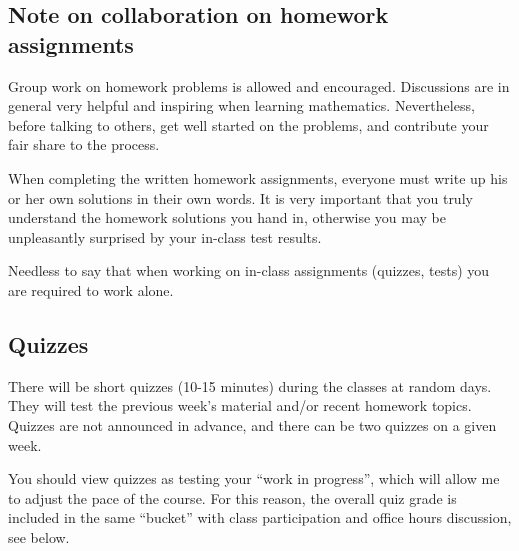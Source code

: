 \documentclass[oneside,11pt]{amsart}
\begin{document}

%

\subsection*{Note on collaboration on homework assignments}
\label{collaboration}

Group work on homework problems is allowed and encouraged.
Discussions are in general very
helpful and inspiring when learning mathematics.
Nevertheless, before talking to others, get well started
on the problems, and contribute your fair share to the process.

When completing the written homework assignments, everyone must write up his or her own
solutions in their own words.
It is very important that you truly understand the homework solutions you hand
in, otherwise you may be unpleasantly surprised by your in-class test results.

Needless to say that when working on in-class assignments (quizzes, tests)
you are required to work alone.

\subsection{Quizzes}

There will be short quizzes (10-15 minutes)
during the classes at random days. 
They will test the previous week's material and/or recent homework
topics. 
Quizzes are not announced in advance, and there can be two quizzes
on a given week. 

You should view quizzes as testing your “work in progress”,
which will allow me to adjust the pace of the course.
For this reason, the overall quiz grade is 
included in the same “bucket” with class participation and 
office hours discussion, see below.
\end{document}

